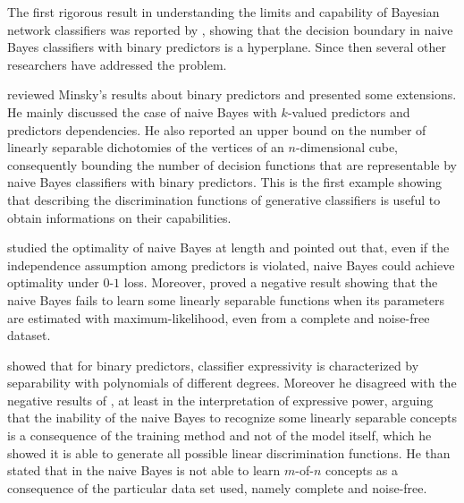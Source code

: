 \documentclass[11pt,a4paper, twoside]{book}
\begin{document}
The first rigorous result in understanding the limits and capability of Bayesian network classifiers was reported by \cite{Minsky61stepstoward}, showing that the decision boundary in naive Bayes classifiers with binary predictors is a hyperplane. Since then several other researchers have addressed the problem.

\citet{peot} reviewed Minsky's results about binary predictors and presented some extensions. He mainly discussed the case of naive Bayes with $k$-valued predictors and predictors dependencies. He also reported an upper bound on the number of linearly separable dichotomies of the vertices of an $n$-dimensional cube, consequently bounding the number of decision functions that are representable by naive Bayes classifiers with binary predictors. This is the first example showing that describing the discrimination functions of generative classifiers is useful to obtain informations on their capabilities.

\citet{Domingos97} studied the optimality of naive Bayes at length and pointed out that, even if the independence assumption among predictors is violated, naive Bayes could achieve optimality under $0$-$1$ loss. Moreover, \cite{Domingos97} proved a negative result showing that the naive Bayes fails to learn some linearly separable functions when its parameters are estimated with maximum-likelihood, even from a complete and noise-free dataset.

\citet{Jaeger03} showed that for binary predictors, classifier expressivity  is characterized by separability with polynomials of different degrees. 
Moreover he disagreed with the negative results of \cite{Domingos97}, at least in the interpretation of expressive power, arguing that the inability of the naive Bayes to recognize some linearly separable concepts is a consequence of the training method and not of the model itself, which he showed it is able to generate all possible linear discrimination functions.
He than stated that in \cite{Domingos97} the naive Bayes is not able to learn $m$-of-$n$ concepts as a consequence of the particular data set used, namely complete and noise-free.
\end{document}
